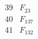 \documentclass{article}
\begin{document}
{$$\begin{array}{|r|*{7}{r|}}
\\
\hline
39 
 &F_{23}  &
 & 
 & 
 & 
 & 
 & 
\\
\hline
40 
 &  F_{137}&
 & 
 & 
 & 
 & 
 & 
\\
\hline
41 
 &  F_{132}&
 & 
 & 
 & 

\end{array}$$}
\end{document}
